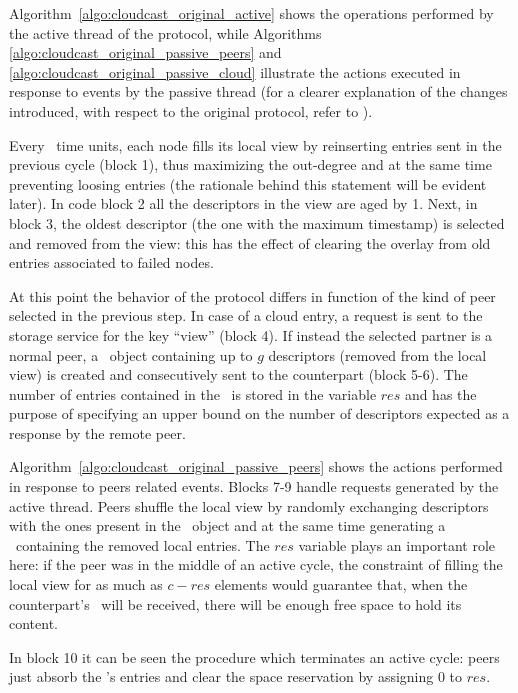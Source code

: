 Algorithm~\ref{algo:cloudcast_original_active} shows the operations
performed by the active thread of the protocol, while Algorithms~
\ref{algo:cloudcast_original_passive_peers} and~
\ref{algo:cloudcast_original_passive_cloud} illustrate the actions
executed in response to events by the passive thread (for a clearer
explanation of the changes introduced, with respect to the original
\cyclon protocol, refer to \cite{Cloudcast}).



Every \deltacyclon\ time units, each node fills its local view by reinserting
entries sent in the previous cycle (block 1), thus
maximizing the out-degree and at the same time preventing loosing
entries (the rationale behind this statement will be evident later).
In code block 2 all the descriptors in the view are aged
by 1. Next, in block 3, the oldest descriptor (the one with
the maximum timestamp) is selected and removed from the view: this
has the effect of clearing the overlay from old entries associated to
failed nodes.

At this point the behavior of the protocol differs in function of the kind
of peer selected in the previous step. In case of a cloud entry, a
request is sent to the storage service for the key ``view''
(block 4). If instead the selected partner is a normal peer,
a \request\ object containing up to $g$ descriptors (removed from the
local view) is created and consecutively sent to the counterpart
(block 5-6). The number of entries contained in
the \request\ is stored in the variable $res$ and has the purpose of
specifying an upper bound on the number of descriptors expected as a
response by the remote peer.

Algorithm~\ref{algo:cloudcast_original_passive_peers} shows the actions
performed in response to peers related
events. Blocks 7-9 handle requests generated by
the active thread. Peers shuffle the local view by randomly exchanging
descriptors with the ones present in the \request\ object
and at the same time generating a \reply\ containing the removed local
entries. The $res$ variable plays an important role here: if the peer
was in the middle of an active cycle, the constraint of filling the
local view for as much as $c - res$ elements would guarantee that, when
the counterpart's \reply\ will be received, there will be enough free
space to hold its content.

In block 10 it can be seen the procedure which terminates an
active cycle: peers just absorb the \reply's entries and clear the
space reservation by assigning 0 to $res$.

